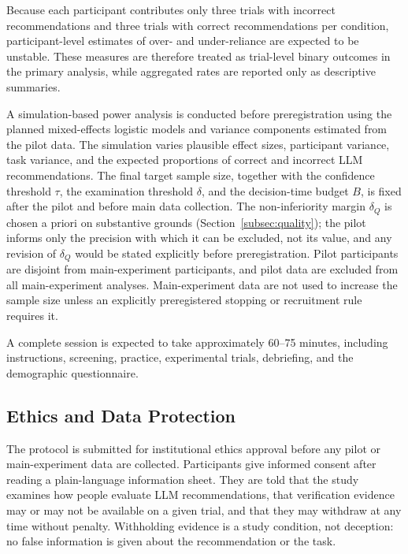 \documentclass[oneside,final,14pt,a4paper]{extreport}
\begin{document}
Because each participant contributes only three trials with incorrect
recommendations and three trials with correct recommendations per condition,
participant-level estimates of over- and under-reliance are expected to be
unstable. These measures are therefore treated as trial-level binary
outcomes in the primary analysis, while aggregated rates are reported only
as descriptive summaries.

A simulation-based power analysis is conducted before preregistration using
the planned mixed-effects logistic models and variance components estimated
from the pilot data. The simulation varies plausible effect sizes, participant
variance, task variance, and the expected proportions of correct and incorrect
LLM recommendations. The final target sample size, together with the
confidence threshold $\tau$, the examination threshold $\delta$, and the
decision-time budget $B$, is fixed
after the pilot and before main data
collection. The non-inferiority margin $\delta_Q$ is chosen a priori on
substantive grounds (Section~\ref{subsec:quality}); the pilot informs only the
precision with which it can be excluded, not its value, and any revision of
$\delta_Q$ would be stated explicitly before preregistration. Pilot participants are disjoint from main-experiment
participants, and pilot data are excluded from all main-experiment analyses.
Main-experiment data are not used to increase the sample size unless an
explicitly preregistered stopping or recruitment rule requires it.

A complete session is expected to take approximately 60--75 minutes,
including instructions, screening, practice, experimental trials, debriefing,
and the demographic questionnaire.

\subsection{Ethics and Data Protection}
\label{subsec:ethics}

The protocol is submitted for institutional ethics approval before any pilot
or main-experiment data are collected. Participants give informed consent
after reading a plain-language information sheet. They are told that the study
examines how people evaluate LLM recommendations, that verification evidence
may or may not be available on a given trial, and that they may withdraw at any
time without penalty. Withholding evidence is a study condition, not
deception: no false information is given about the recommendation or the task.
\end{document}
